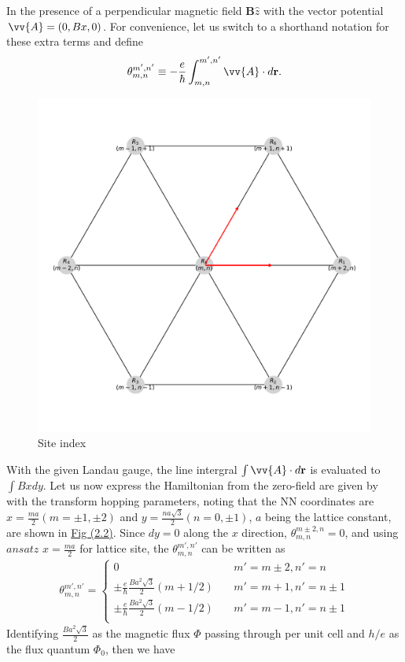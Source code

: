 \documentclass{report}
\newcommand{\f}[2]{\dfrac{#1}{#2}}
\begin{document}
In the presence of a perpendicular magnetic field $\mathbf{B} \hat{z}$ with the vector potential $\vv{A} = (0, Bx, 0)$. For convenience, let us switch to a shorthand notation for these extra terms and define
\begin{gather}
	\theta_{m,n}^{m',n'} \equiv - \f{e}{\hbar} \int_{m,n}^{m',n'} \vv{A} \cdot d\mathbf{r}.
\end{gather}
\begin{figure}[H]
	\centering
	\includegraphics[width=0.5\linewidth,height=0.5\linewidth]{pic/siteindice.pdf}
	\caption{\label{fig:site index} Site index}
\end{figure}
With the given Landau gauge, the line intergral $\int \vv{A} \cdot d\mathbf{r}$ is evaluated to $\int Bx dy$. Let us now express the Hamiltonian from the zero-field are given by \cite{PhysRevB.88.085433} with the transform hopping parameters, noting that the NN coordinates are $x = \frac{ma}{2}(m = \pm 1, \pm 2)$ and $y = \frac{na\sqrt{3}}{2}(n = 0,\pm 1)$, $a$ being the lattice constant, are shown in \hyperref[fig:site index]{Fig (2.2)}. Since $dy = 0$ along the $x$ direction, $\theta_{m,n}^{m \pm 2, n} = 0$, and using $ansatz$ $x = \frac{ma}{2}$ for lattice site, the $\theta_{m,n}^{m',n'}$ can be written as
\begin{gather}
	\theta_{m,n}^{m',n'} =
	\begin{cases}
		0   						  & \quad m' = m \pm 2, n' = n\\
		\pm \frac{e}{\hbar} \frac{B a^{2} \sqrt{3}}{2} (m + 1 /2) & \quad m' = m + 1, n' = n \pm 1\\
		\pm \frac{e}{\hbar} \frac{B a^{2} \sqrt{3}}{2} (m - 1 /2) & \quad m' = m - 1, n' = n \pm 1\\
	\end{cases}
\end{gather}
Identifying $\frac{B a^{2} \sqrt{3}}{2}$ as the magnetic flux $\Phi$ passing through per unit cell and $h / e$ as the flux quantum $\Phi_{0}$, then we have
\end{document}
